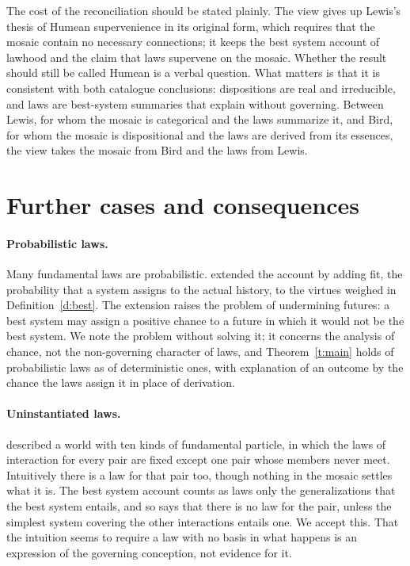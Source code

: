 \documentclass{situationist-preprint}
\begin{document}
The cost of the reconciliation should be stated plainly. The view gives up Lewis's thesis of Humean supervenience in its original form, which requires that the mosaic contain no necessary connections; it keeps the best system account of lawhood and the claim that laws supervene on the mosaic. Whether the result should still be called Humean is a verbal question. What matters is that it is consistent with both catalogue conclusions: dispositions are real and irreducible, and laws are best-system summaries that explain without governing. Between Lewis, for whom the mosaic is categorical and the laws summarize it, and Bird, for whom the mosaic is dispositional and the laws are derived from its essences, the view takes the mosaic from Bird and the laws from Lewis.

\section{Further cases and consequences}\label{s:cases}

\paragraph{Probabilistic laws.} Many fundamental laws are probabilistic. \citet{Lewis1994} extended the account by adding fit, the probability that a system assigns to the actual history, to the virtues weighed in Definition~\ref{d:best}. The extension raises the problem of undermining futures: a best system may assign a positive chance to a future in which it would not be the best system. We note the problem without solving it; it concerns the analysis of chance, not the non-governing character of laws, and Theorem~\ref{t:main} holds of probabilistic laws as of deterministic ones, with explanation of an outcome by the chance the laws assign it in place of derivation.

\paragraph{Uninstantiated laws.} \citet{Tooley1977} described a world with ten kinds of fundamental particle, in which the laws of interaction for every pair are fixed except one pair whose members never meet. Intuitively there is a law for that pair too, though nothing in the mosaic settles what it is. The best system account counts as laws only the generalizations that the best system entails, and so says that there is no law for the pair, unless the simplest system covering the other interactions entails one. We accept this. That the intuition seems to require a law with no basis in what happens is an expression of the governing conception, not evidence for it.
\end{document}
